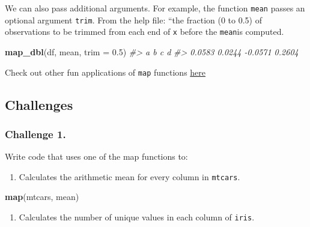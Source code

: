 \documentclass[]{book}
\newenvironment{Shaded}{\begin{snugshade}}{\end{snugshade}}
\newcommand{\KeywordTok}[1]{\textcolor[rgb]{0.13,0.29,0.53}{\textbf{#1}}}
\newcommand{\DataTypeTok}[1]{\textcolor[rgb]{0.13,0.29,0.53}{#1}}
\newcommand{\FloatTok}[1]{\textcolor[rgb]{0.00,0.00,0.81}{#1}}
\newcommand{\StringTok}[1]{\textcolor[rgb]{0.31,0.60,0.02}{#1}}
\newcommand{\CommentTok}[1]{\textcolor[rgb]{0.56,0.35,0.01}{\textit{#1}}}
\newcommand{\OperatorTok}[1]{\textcolor[rgb]{0.81,0.36,0.00}{\textbf{#1}}}
\newcommand{\NormalTok}[1]{#1}
\providecommand{\tightlist}{%
  \setlength{\itemsep}{0pt}\setlength{\parskip}{0pt}}
\begin{document}
We can also pass additional arguments. For example, the function
\texttt{mean} passes an optional argument \texttt{trim}. From the help
file: ``the fraction (0 to 0.5) of observations to be trimmed from each
end of \texttt{x} before the \texttt{mean}is computed.

\begin{Shaded}
\begin{Highlighting}[]
\KeywordTok{map_dbl}\NormalTok{(df, mean, }\DataTypeTok{trim =} \FloatTok{0.5}\NormalTok{)}
\CommentTok{#>       a       b       c       d }
\CommentTok{#>  0.0583  0.0244 -0.0571  0.2604}
\end{Highlighting}
\end{Shaded}

Check out other fun applications of \texttt{map} functions
\href{https://r4ds.had.co.nz/iteration.html\#the-map-functions}{here}

\subsection{Challenges}\label{challenges-23}

\subsubsection*{Challenge 1.}\label{challenge-1.-12}

Write code that uses one of the map functions to:

\begin{enumerate}
\def\labelenumi{\arabic{enumi}.}
\tightlist
\item
  Calculates the arithmetic mean for every column in \texttt{mtcars}.
\end{enumerate}

\begin{Shaded}
\begin{Highlighting}[]
\KeywordTok{map}\NormalTok{(mtcars, mean)}
\end{Highlighting}
\end{Shaded}

\begin{enumerate}
\def\labelenumi{\arabic{enumi}.}
\setcounter{enumi}{1}
\tightlist
\item
  Calculates the number of unique values in each column of
  \texttt{iris}.
\end{enumerate}

\begin{Shaded}
\end{Shaded}
\end{document}
